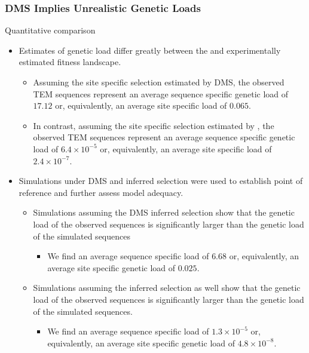 \documentclass[12pt]{article}
\begin{document}
\begin{itemize}
\subsubsection*{DMS Implies Unrealistic Genetic Loads}
Quantitative comparison
\begin{itemize}
	\item Estimates of genetic load differ greatly between the \selac and experimentally estimated fitness landscape.
	\begin{itemize}
		\item Assuming the site specific selection estimated by DMS, the observed TEM sequences represent an average sequence specific genetic load of $17.12$ or, equivalently, an average site specific load of $0.065$.
		\item In contrast, assuming the site specific selection estimated by \selac, the observed TEM sequences represent an average sequence specific genetic load of $6.4\times10^{-5}$ or, equivalently, an average site specific load of $2.4\times10^{-7}$.
	\end{itemize}
	\item Simulations under DMS and \selac inferred selection were used to establish point of reference and further assess model adequacy.
	\begin{itemize}
		\item Simulations assuming the DMS inferred selection show that the genetic load of the observed sequences is significantly larger than the genetic load of the simulated sequences
		\begin{itemize}
			\item We find an average sequence specific load of $6.68$ or, equivalently, an average site specific genetic load of $0.025$.
		\end{itemize}
		\item Simulations assuming the \selac inferred selection as well show that the genetic load of the observed sequences is significantly larger than the genetic load of the simulated sequences.
		\begin{itemize}
			\item We find an average sequence specific load of $1.3\times10^{-5}$ or, equivalently, an average site specific genetic load of $4.8\times 10^{-8}$.
		\end{itemize}
	\end{itemize}
\end{itemize}



\end{itemize}
\end{document}
